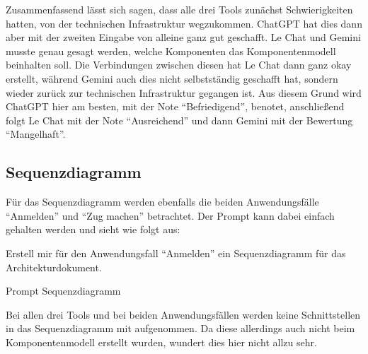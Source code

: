 Zusammenfassend lässt sich sagen, dass alle drei Tools zunächst Schwierigkeiten hatten, von der technischen Infrastruktur wegzukommen. ChatGPT 
hat dies dann aber mit der zweiten Eingabe von alleine ganz gut geschafft. Le Chat und Gemini musste genau gesagt werden, welche Komponenten das 
Komponentenmodell beinhalten soll. Die Verbindungen zwischen diesen hat Le Chat dann ganz okay erstellt, während Gemini auch dies nicht 
selbstständig geschafft hat, sondern wieder zurück zur technischen Infrastruktur gegangen ist. Aus diesem Grund wird ChatGPT hier am besten, mit 
der Note ``Befriedigend'', benotet, anschließend folgt Le Chat mit der Note ``Ausreichend'' und dann Gemini mit der Bewertung ``Mangelhaft''.

\subsection*{Sequenzdiagramm}

Für das Sequenzdiagramm werden ebenfalls die beiden Anwendungsfälle ``Anmelden'' und ``Zug machen'' betrachtet. Der Prompt 
kann dabei einfach gehalten werden und sieht wie folgt aus:

\begin{prompt}[H]
    \begin{tcolorbox}[colback=gray!20, colframe=gray!20, boxrule=0pt, sharp corners] 
        Erstell mir für den Anwendungsfall ``Anmelden'' ein Sequenzdiagramm für das Architekturdokument.
        \vfill
    \end{tcolorbox}
    \caption{Prompt Sequenzdiagramm}
    \label{Prompt Sequenzdiagramm}
\end{prompt}

Bei allen drei Tools und bei beiden Anwendungsfällen werden keine Schnittstellen in das Sequenzdiagramm mit 
aufgenommen. Da diese allerdings auch nicht beim Komponentenmodell erstellt wurden, wundert dies hier nicht allzu sehr.

